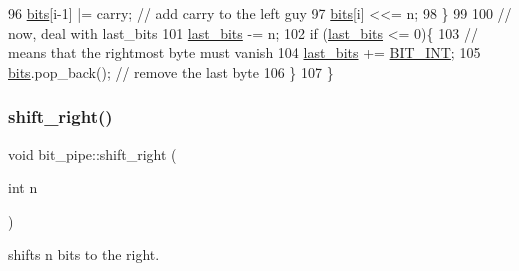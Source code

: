 \begin{DoxyCode}
96       \hyperlink{classbit__pipe_a86f38af1e9736b053728033490476b50}{bits}[i-1] |= carry; \textcolor{comment}{// add carry to the left guy}
97     \hyperlink{classbit__pipe_a86f38af1e9736b053728033490476b50}{bits}[i] <<= n; 
98   \}
99 
100   \textcolor{comment}{// now, deal with last\_bits}
101   \hyperlink{classbit__pipe_a0f3e84b02751803adaab499b5dad86fe}{last\_bits} -= n;
102   \textcolor{keywordflow}{if} (\hyperlink{classbit__pipe_a0f3e84b02751803adaab499b5dad86fe}{last\_bits} <= 0)\{
103     \textcolor{comment}{// means that the rightmost byte must vanish}
104     \hyperlink{classbit__pipe_a0f3e84b02751803adaab499b5dad86fe}{last\_bits} += \hyperlink{bitstream_8h_afcadf5aa65c5159bfb96c4d82ebc0a5d}{BIT\_INT};
105     \hyperlink{classbit__pipe_a86f38af1e9736b053728033490476b50}{bits}.pop\_back(); \textcolor{comment}{// remove the last byte}
106   \}
107 \}
\end{DoxyCode}
\mbox{\label{classbit__pipe_a341a1f62d728a67f730503ca722a7770}} 
\subsubsection{\texorpdfstring{shift\+\_\+right()}{shift\_right()}}
{\footnotesize\ttfamily void bit\+\_\+pipe\+::shift\+\_\+right (\begin{DoxyParamCaption}\item[{int}]{n }\end{DoxyParamCaption})}



shifts n bits to the right. 

